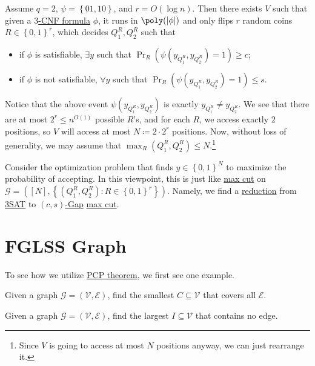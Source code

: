 Assume \(q = 2\), \(\psi = \left\{ 01, 10 \right\} \), and \(r = O(\log n)\). Then there exists \(V\) such that given a \hyperref[def:k-CNF]{\(3\)-CNF formula} \(\phi \), it runs in \(\poly(\vert \phi  \vert )\) and only flips \(r\) random coins \(R\in \left\{ 0, 1 \right\} ^r\), which decides \(Q_1^R, Q_2^R\) such that
\begin{itemize}
	\item if \(\phi \) is satisfiable, \(\exists y\) such that \(\Pr_{R}(\psi (y_{Q_1^R}, y_{Q_2^R}) = 1) \geq c\);
	\item if \(\phi \) is not satisfiable, \(\forall y\) such that \(\Pr_{R}(\psi (y_{Q_1^R}, y_{Q_2^R}) = 1) \leq s\).
\end{itemize}
Notice that the above event \(\psi (y_{Q_1^R}, y_{Q_2^R})\) is exactly \(y_{Q_1^R} \neq y_{Q_2^R}\). We see that there are at most \(2^r \leq n^{O(1)}\) possible \(R\)'s, and for each \(R\), we access exactly \(2\) positions, so \(V\) will access at most \(N\coloneqq 2\cdot 2^r\) positions. Now, without loss of generality, we may assume that \(\max _R (Q_1^R, Q_2^R) \leq N\).\footnote{Since \(V\) is going to access at most \(N\) positions anyway, we can just rearrange it.}

Consider the optimization problem that finds \(y\in \left\{ 0, 1 \right\} ^N\) to maximize the probability of accepting. In this viewpoint, this is just like \hyperref[prb:max-cut]{max cut} on \(\mathcal{G} =([N], \left\{ (Q_1^R, Q_2^R)\colon R\in \left\{ 0, 1 \right\} ^r \right\} )\). Namely, we find a \hyperref[def:reduction]{reduction} from \hyperref[prb:max-3SAT]{3SAT} to \hyperref[def:c-s-Gap]{\((c, s)\)-Gap} \hyperref[prb:max-cut]{max cut}.

\section{FGLSS Graph}
To see how we utilize \hyperref[thm:PCP]{PCP theorem}, we first see one example.

\begin{problem}\label{prb:vertex-cover}
Given a graph \(\mathcal{G} =(\mathcal{V} , \mathcal{E} )\), find the smallest \(C \subseteq \mathcal{V} \) that covers all \(\mathcal{E} \).
\end{problem}

\begin{problem}\label{prb:independent-set}
Given a graph \(\mathcal{G} =(\mathcal{V} , \mathcal{E} )\), find the largest \(I \subseteq \mathcal{V} \) that contains no edge.
\end{problem}

